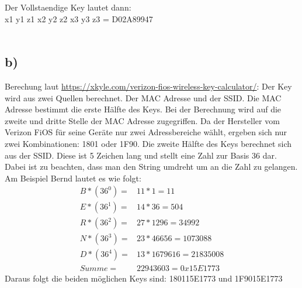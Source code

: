 \documentclass[10pt,a4paper]{article}
\begin{document}
Der Vollstaendige Key lautet dann:\\
x1 y1 z1 x2 y2 z2 x3 y3 z3 = D02A89947 \\\\


\subsection*{b)}
Berechung laut \href{https://xkyle.com/verizon-fios-wireless-key-calculator/}{https://xkyle.com/verizon-fios-wireless-key-calculator/}:
Der Key wird aus zwei Quellen berechnet. Der MAC Adresse und der SSID. Die MAC Adresse bestimmt die erste Hälfte des Keys. Bei der Berechnung wird auf die zweite und dritte Stelle der MAC Adresse zugegriffen. Da der Hersteller vom Verizon FiOS für seine Geräte nur zwei Adressbereiche wählt, ergeben sich nur zwei Kombinationen: 1801 oder 1F90. 
Die zweite Hälfte des Keys berechnet sich aus der SSID. Diese ist 5 Zeichen lang und stellt eine Zahl zur Basis 36 dar. Dabei ist zu beachten, dass man den String umdreht um an die Zahl zu gelangen.
Am Beispiel Bernd lautet es wie folgt:\\
\begin{align*}
B*(36^0) = &11 * 1 = 11\\
E*(36^1) = &14 * 36 = 504\\
R*(36^2) = &27 * 1296 = 34992\\
N*(36^3) = &23 * 46656 = 1073088\\
D*(36^4) = &13 * 1679616 = 21835008\\
Summe = &22943603 = 0x15E1773
\end{align*}
Daraus folgt die beiden möglichen Keys sind: 180115E1773 und 1F9015E1773
\end{document}
